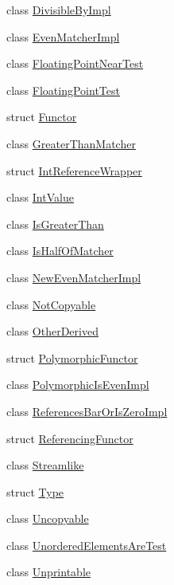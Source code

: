 \begin{DoxyCompactItemize}
\item 
class \hyperlink{classtesting_1_1gmock__matchers__test_1_1_divisible_by_impl}{Divisible\+By\+Impl}
\item 
class \hyperlink{classtesting_1_1gmock__matchers__test_1_1_even_matcher_impl}{Even\+Matcher\+Impl}
\item 
class \hyperlink{classtesting_1_1gmock__matchers__test_1_1_floating_point_near_test}{Floating\+Point\+Near\+Test}
\item 
class \hyperlink{classtesting_1_1gmock__matchers__test_1_1_floating_point_test}{Floating\+Point\+Test}
\item 
struct \hyperlink{structtesting_1_1gmock__matchers__test_1_1_functor}{Functor}
\item 
class \hyperlink{classtesting_1_1gmock__matchers__test_1_1_greater_than_matcher}{Greater\+Than\+Matcher}
\item 
struct \hyperlink{structtesting_1_1gmock__matchers__test_1_1_int_reference_wrapper}{Int\+Reference\+Wrapper}
\item 
class \hyperlink{classtesting_1_1gmock__matchers__test_1_1_int_value}{Int\+Value}
\item 
class \hyperlink{classtesting_1_1gmock__matchers__test_1_1_is_greater_than}{Is\+Greater\+Than}
\item 
class \hyperlink{classtesting_1_1gmock__matchers__test_1_1_is_half_of_matcher}{Is\+Half\+Of\+Matcher}
\item 
class \hyperlink{classtesting_1_1gmock__matchers__test_1_1_new_even_matcher_impl}{New\+Even\+Matcher\+Impl}
\item 
class \hyperlink{classtesting_1_1gmock__matchers__test_1_1_not_copyable}{Not\+Copyable}
\item 
class \hyperlink{classtesting_1_1gmock__matchers__test_1_1_other_derived}{Other\+Derived}
\item 
struct \hyperlink{structtesting_1_1gmock__matchers__test_1_1_polymorphic_functor}{Polymorphic\+Functor}
\item 
class \hyperlink{classtesting_1_1gmock__matchers__test_1_1_polymorphic_is_even_impl}{Polymorphic\+Is\+Even\+Impl}
\item 
class \hyperlink{classtesting_1_1gmock__matchers__test_1_1_references_bar_or_is_zero_impl}{References\+Bar\+Or\+Is\+Zero\+Impl}
\item 
struct \hyperlink{structtesting_1_1gmock__matchers__test_1_1_referencing_functor}{Referencing\+Functor}
\item 
class \hyperlink{classtesting_1_1gmock__matchers__test_1_1_streamlike}{Streamlike}
\item 
struct \hyperlink{structtesting_1_1gmock__matchers__test_1_1_type}{Type}
\item 
class \hyperlink{classtesting_1_1gmock__matchers__test_1_1_uncopyable}{Uncopyable}
\item 
class \hyperlink{classtesting_1_1gmock__matchers__test_1_1_unordered_elements_are_test}{Unordered\+Elements\+Are\+Test}
\item 
class \hyperlink{classtesting_1_1gmock__matchers__test_1_1_unprintable}{Unprintable}
\end{DoxyCompactItemize}
